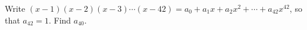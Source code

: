 Write $(x-1)(x-2)(x-3)\cdots(x-42)=a_0+a_1x+a_2x^2+\cdots+a_{42}x^{42}$, so that $a_{42}=1$. Find $a_{40}$.
